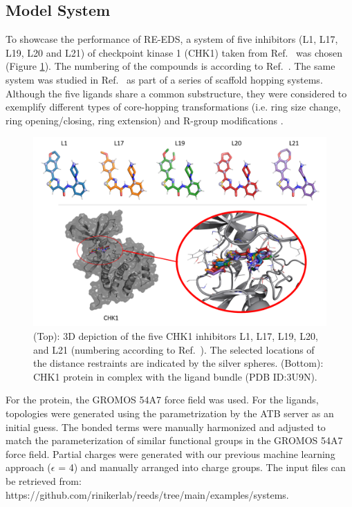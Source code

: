 \subsection{Model System}
To showcase the performance of RE-EDS, a system of five inhibitors (L1, L17, L19, L20 and L21) of checkpoint kinase 1 (CHK1) taken from Ref.~\cite{Huang2012} was chosen (Figure \ref{fig:Ligands/Protein}). The numbering of the compounds is according to Ref.~\cite{Huang2012}. The same system was studied in Ref.~\cite{Wang2017} as part of a series of scaffold hopping systems. Although the five ligands share a common substructure, they were considered to exemplify different types of core-hopping transformations (i.e. ring size change, ring opening/closing, ring extension) and R-group modifications \cite{Wang2017}.

\begin{figure}[h]
    \centering
    \includegraphics[width=\columnwidth]{fig/methods/CHK1_ring_opening_system_condense.png}
    \caption{(Top): 3D depiction of the five CHK1 inhibitors L1, L17, L19, L20, and L21 (numbering according to Ref.~\cite{Huang2012}). The selected locations of the distance restraints are indicated by the silver spheres. (Bottom): CHK1 protein in complex with the ligand bundle (PDB ID:3U9N).}
    \label{fig:Ligands/Protein}
\end{figure}

For the protein, the GROMOS 54A7 force field \cite{Schmid2011} was used. For the ligands, topologies were generated using the parametrization by the ATB server \cite{Mark2011} as an initial guess. The bonded terms were manually harmonized and adjusted to match the parameterization of similar functional groups in the GROMOS 54A7 force field. Partial charges were generated with our previous machine learning approach \cite{Bleiziffer2018} ($\epsilon$ = 4) and manually arranged into charge groups. The input files can be retrieved from: \\ https://github.com/rinikerlab/reeds/tree/main/examples/systems.

